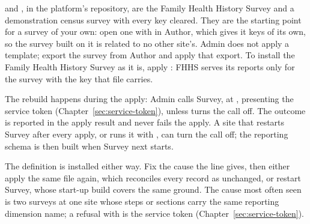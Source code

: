 \documentclass[11pt, a4paper]{article}
\begin{document}


\begin{elicitnote}
 and
, in the platform's repository, are the
Family Health History Survey and a demonstration census survey with every key cleared. They are
the starting point for a survey of your own: open one with  in Author,
which gives it keys of its own, so the survey built on it is related to no other site's. Admin
does not apply a template; export the survey from Author and apply that export. To install the
Family Health History Survey as it is, apply : FHHS
serves its reports only for the survey with the key that file carries.
\end{elicitnote}

\begin{elicitnote}
The rebuild happens during the apply: Admin calls Survey, at ,
presenting the service token (Chapter~\ref{sec:service-token}), unless
 turns the call off. The outcome is reported in the apply
result and never fails the apply. A site that restarts Survey after every apply, or runs it with
, can turn the call off; the reporting schema is then built
when Survey next starts.
\end{elicitnote}

\begin{elicitcaution}
The definition is installed either way. Fix the cause the line gives, then either apply the
same file again, which reconciles every record as unchanged, or restart Survey, whose start-up
build covers the same ground. The cause most often seen is two surveys at one site whose steps
or sections carry the same reporting dimension name; a refusal with  is the service
token (Chapter~\ref{sec:service-token}).
\end{elicitcaution}
\end{document}
